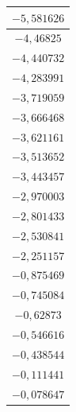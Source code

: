 \begin{table}[h]
\begin{minipage}[h]{0.49\linewidth}
\begin{center}
\begin{tabular}{|c|}
          $-5{,}581626$ \\
          \hline 
        
          $-4{,}46825$ \\
          \hline 
        
          $-4{,}440732$ \\
          \hline 
        
          $-4{,}283991$ \\
          \hline 
        
          $-3{,}719059$ \\
          \hline 
        
          $-3{,}666468$ \\
          \hline 
        
          $-3{,}621161$ \\
          \hline 
        
          $-3{,}513652$ \\
          \hline 
        
          $-3{,}443457$ \\
          \hline 
        
          $-2{,}970003$ \\
          \hline 
        
          $-2{,}801433$ \\
          \hline 
        
          $-2{,}530841$ \\
          \hline 
        
          $-2{,}251157$ \\
          \hline 
        
          $-0{,}875469$ \\
          \hline 
        
          $-0{,}745084$ \\
          \hline 
        
          $-0{,}62873$ \\
          \hline 
        
          $-0{,}546616$ \\
          \hline 
        
          $-0{,}438544$ \\
          \hline 
        
          $-0{,}111441$ \\
          \hline 
        
          $-0{,}078647$ \\
          \hline 
        

\end{tabular}
\end{center}
\end{minipage}
\end{table}
